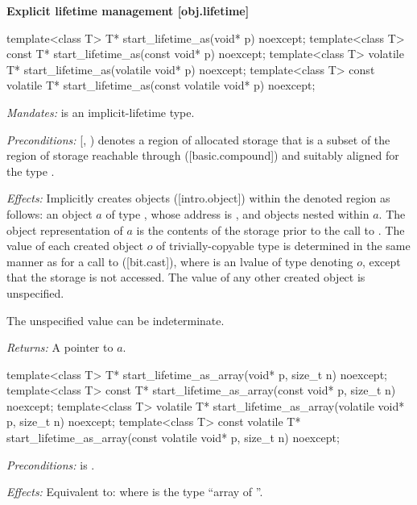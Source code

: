 \begin{addedblock}
\textbf{Explicit lifetime management \hspace{83mm}[obj.lifetime]}

\begin{codeblock}
template<class T>
  T* start_lifetime_as(void* p) noexcept;
template<class T>
  const T* start_lifetime_as(const void* p) noexcept;
template<class T>
  volatile T* start_lifetime_as(volatile void* p) noexcept;
template<class T>
  const volatile T* start_lifetime_as(const volatile void* p) noexcept;
\end{codeblock}

\begin{adjustwidth}{0.5cm}{0.5cm}
\emph{Mandates:}  is an implicit-lifetime type.

\emph{Preconditions:} [, ) denotes a region of allocated storage that is a subset of the region of storage reachable through ([basic.compound])  and suitably aligned for the type .

\emph{Effects:} Implicitly creates objects ([intro.object]) within the denoted region as follows: an object $a$ of type , whose address is , and objects nested within $a$. The object representation of $a$ is the contents of the storage prior to the call to . The value of each created object $o$ of trivially-copyable type  is determined in the same manner as for a call to  ([bit.cast]), where  is an lvalue of type  denoting $o$, except that the storage is not accessed. The value of any other created object is unspecified. \begin{note}The unspecified value can be indeterminate.\end{note}

\emph{Returns:} A pointer to $a$.
\end{adjustwidth}

\begin{codeblock}
template<class T>
  T* start_lifetime_as_array(void* p, size_t n) noexcept;
template<class T>
  const T* start_lifetime_as_array(const void* p, size_t n) noexcept;
template<class T>
  volatile T* start_lifetime_as_array(volatile void* p, size_t n) noexcept;
template<class T>
  const volatile T* start_lifetime_as_array(const volatile void* p, size_t n) noexcept;
\end{codeblock}

\begin{adjustwidth}{0.5cm}{0.5cm}
\emph{Preconditions:}  is .

\emph{Effects:} Equivalent to:  where  is the type ``array of  ''.
\end{adjustwidth}

\end{addedblock}

